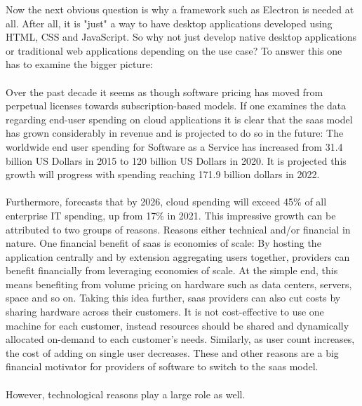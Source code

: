 Now the next obvious question is why a framework such as Electron is needed at all.
After all, it is "just" a way to have desktop applications developed using HTML, CSS and JavaScript.
So why not just develop native desktop applications or traditional web applications depending on the use case?
To answer this one has to examine the bigger picture:\paragraph{}
Over the past decade it seems as though software pricing has moved from perpetual licenses towards subscription-based
models.
If one examines the data regarding end-user spending on cloud applications it is clear that the
\acrfull{saas} model has grown considerably in revenue and is projected to do so in the future:
The worldwide end user spending for Software as a Service has increased from 31.4 billion US Dollars in 2015 to 120
billion US Dollars in 2020.
It is projected this growth will progress with spending reaching 171.9 billion dollars in 2022. \parencite{gartner2021}\paragraph{}
Furthermore, \textcite{gartner2021} forecasts that by 2026, cloud spending will exceed 45\% of all enterprise IT spending, up from
17\% in 2021.
This impressive growth can be attributed to two groups of reasons.
Reasons either technical and/or financial in nature.
One financial benefit of \acrshort{saas} is economies of scale:
By hosting the application centrally and by extension aggregating users together, providers can benefit financially from
leveraging economies of scale.
At the simple end, this means benefiting from volume pricing on hardware such as data centers, servers, space and so on.
Taking this idea further, \acrshort{saas} providers can also cut costs by sharing hardware across their customers.
It is not cost-effective to use one machine for each customer, instead resources should be shared and dynamically
allocated on-demand to each customer's needs.
Similarly, as user count increases, the cost of adding on single user decreases.
These and other reasons are a big financial motivator for providers of software to switch to the \acrshort{saas} model. \parencite{jacobs2005}\paragraph{}
However, technological reasons play a large role as well.
